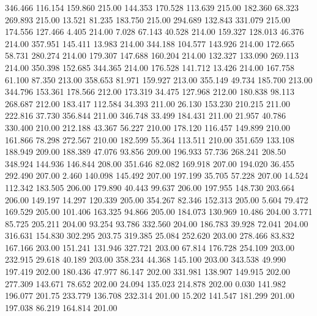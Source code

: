  346.466  116.154  159.860       215.00
 144.353  170.528  113.639       215.00
 182.360   68.323  269.893       215.00
  13.521   81.235  183.750       215.00
 294.689  132.843  331.079       215.00
 174.556  127.466    4.405       214.00
   7.028   67.143   40.528       214.00
 159.327  128.013   46.376       214.00
 357.951  145.411   13.983       214.00
 344.188  104.577  143.926       214.00
 172.665   58.731  280.274       214.00
 179.307  147.688  160.204       214.00
 132.327  133.090  269.113       214.00
 350.398  152.685  344.365       214.00
 176.528  141.712   13.426       214.00
 167.758   61.100   87.350       213.00
 358.653   81.971  159.927       213.00
 355.149   49.734  185.700       213.00
 344.796  153.361  178.566       212.00
 173.319   34.475  127.968       212.00
 180.838   98.113  268.687       212.00
 183.417  112.584   34.393       211.00
  26.130  153.230  210.215       211.00
 222.816   37.730  356.844       211.00
 346.748   33.499  184.431       211.00
  21.957   40.786  330.400       210.00
 212.188   43.367   56.227       210.00
 178.120  116.457  149.899       210.00
 161.866   78.298  272.567       210.00
 182.599   55.364  113.511       210.00
 351.659  133.108  188.949       209.00
 188.389   47.076   93.856       209.00
 196.933   57.736  268.241       208.50
 348.924  144.936  146.844       208.00
 351.646   82.082  169.918       207.00
 194.020   36.455  292.490       207.00
   2.460  140.098  145.492       207.00
 197.199   35.705   57.228       207.00
  14.524  112.342  183.505       206.00
 179.890   40.443   99.637       206.00
 197.955  148.730  203.664       206.00
 149.197   14.297  120.339       205.00
 354.267   82.346  152.313       205.00
   5.604   79.472  169.529       205.00
 101.406  163.325   94.866       205.00
 184.073  130.969   10.486       204.00
   3.771   85.725  205.211       204.00
  93.254   93.786  332.560       204.00
 186.783   39.928   72.041       204.00
 316.631  154.830  302.295       203.75
 319.385   25.084  252.620       203.00
 278.466   83.832  167.166       203.00
 151.241  131.946  327.721       203.00
  67.814  176.728  254.109       203.00
 232.915   29.618   40.189       203.00
 358.234   44.368  145.100       203.00
 343.538   49.990  197.419       202.00
 180.436   47.977   86.147       202.00
 331.981  138.907  149.915       202.00
 277.309  143.671   78.652       202.00
  24.094  135.023  214.878       202.00
   0.030  141.982  196.077       201.75
 233.779  136.708  232.314       201.00
  15.202  141.547  181.299       201.00
 197.038   86.219  164.814       201.00
